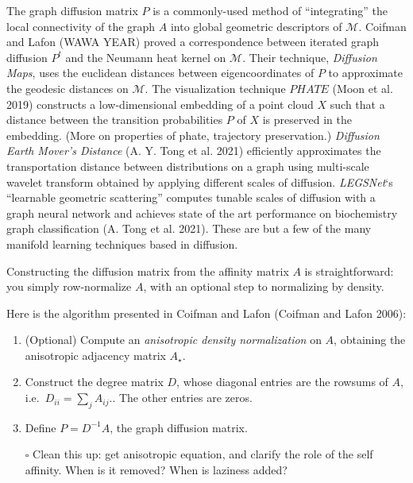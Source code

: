 \documentclass[
  letterpaper,
  DIV=11,
  numbers=noendperiod]{scrartcl}
\providecommand{\tightlist}{%
  \setlength{\itemsep}{0pt}\setlength{\parskip}{0pt}}\usepackage{longtable,booktabs,array}
\theoremstyle{plain}
\theoremstyle{plain}
\theoremstyle{definition}
\theoremstyle{definition}
\theoremstyle{remark}
\begin{document}
The graph diffusion matrix \(P\) is a commonly-used method of
``integrating'' the local connectivity of the graph \(A\) into global
geometric descriptors of \(\mathcal{M}\). Coifman and Lafon (WAWA YEAR)
proved a correspondence between iterated graph diffusion \(P^t\) and the
Neumann heat kernel on \(\mathcal{M}\). Their technique, \emph{Diffusion
Maps}, uses the euclidean distances between eigencoordinates of \(P\) to
approximate the geodesic distances on \(\mathcal{M}\). The visualization
technique \(PHATE\) (Moon et al. 2019) constructs a low-dimensional
embedding of a point cloud \(X\) such that a distance between the
transition probabilities \(P\) of \(X\) is preserved in the embedding.
(More on properties of phate, trajectory preservation.) \emph{Diffusion
Earth Mover's Distance} (A. Y. Tong et al. 2021) efficiently
approximates the transportation distance between distributions on a
graph using multi-scale wavelet transform obtained by applying different
scales of diffusion. \emph{LEGSNet}`s ``learnable geometric scattering''
computes tunable scales of diffusion with a graph neural network and
achieves state of the art performance on biochemistry graph
classification (A. Tong et al. 2021). These are but a few of the many
manifold learning techniques based in diffusion.

Constructing the diffusion matrix from the affinity matrix \(A\) is
straightforward: you simply row-normalize \(A\), with an optional step
to normalizing by density.

Here is the algorithm presented in Coifman and Lafon (Coifman and Lafon
2006):

\begin{enumerate}
\def\labelenumi{\arabic{enumi}.}
\tightlist
\item
  (Optional) Compute an \emph{anisotropic density normalization} on
  \(A\), obtaining the anisotropic adjacency matrix \(A_{\star}\).
\item
  Construct the degree matrix \(D\), whose diagonal entries are the
  rowsums of \(A\), i.e.~\(D_{ii} = \sum_{j}A_{ij}\).. The other entries
  are zeros.
\item
  Define \(P = D^{-1} A\), the graph diffusion matrix.
\end{enumerate}

\begin{itemize}
\tightlist
\item[$\square$]
  Clean this up: get anisotropic equation, and clarify the role of the
  self affinity. When is it removed? When is laziness added?
\end{itemize}
\end{document}
